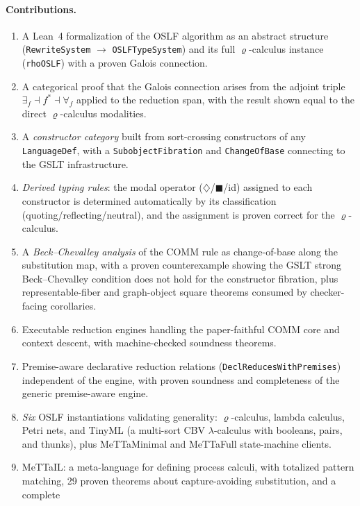 \documentclass[]{article}
\newcommand{\code}[1]{\texttt{#1}}
\newcommand{\rhocalc}{\ensuremath{\varrho}}
\newcommand{\Dia}{\ensuremath{\diamondsuit}}
\newcommand{\Bx}{\ensuremath{\blacksquare}}
\newcommand{\OSLF}{\textup{OSLF}}
\newcommand{\MeTTaIL}{\textup{MeTTaIL}}
\begin{document}
\paragraph{Contributions.}
\begin{enumerate}
\item A Lean~4 formalization of the \OSLF{} algorithm as an abstract structure
  (\code{RewriteSystem} $\to$ \code{OSLFTypeSystem}) and its full \rhocalc{}-calculus
  instance (\code{rhoOSLF}) with a proven Galois connection.
\item A categorical proof that the Galois connection arises from the adjoint triple
  $\exists_f \dashv f^* \dashv \forall_f$ applied to the reduction span, with the
  result shown equal to the direct \rhocalc{}-calculus modalities.
\item A \emph{constructor category} built from sort-crossing constructors of any
  \code{LanguageDef}, with a \code{SubobjectFibration} and \code{ChangeOfBase}
  connecting to the GSLT infrastructure.
\item \emph{Derived typing rules}: the modal operator ($\Dia$/$\Bx$/id) assigned to
  each constructor is determined automatically by its classification
  (quoting/reflecting/neutral), and the assignment is proven correct for the
  \rhocalc{}-calculus.
\item A \emph{Beck--Chevalley analysis} of the COMM rule as change-of-base along the
  substitution map, with a proven counterexample showing the GSLT strong
  Beck--Chevalley condition does not hold for the constructor fibration, plus
  representable-fiber and graph-object square theorems consumed by checker-facing
  corollaries.
\item Executable reduction engines handling the paper-faithful COMM core and context descent, with
  machine-checked soundness theorems.
\item Premise-aware declarative reduction relations
  (\code{DeclReducesWithPremises}) independent of the engine, with proven
  soundness and completeness of the generic premise-aware engine.
\item \emph{Six} \OSLF{} instantiations validating generality:
  \rhocalc{}-calculus, lambda calculus, Petri nets, and TinyML (a multi-sort CBV
  $\lambda$-calculus with booleans, pairs, and thunks), plus MeTTaMinimal and
  MeTTaFull state-machine clients.
\item \MeTTaIL{}: a meta-language for defining process calculi, with totalized pattern
  matching, 29 proven theorems about capture-avoiding substitution, and a complete

\end{enumerate}
\end{document}
